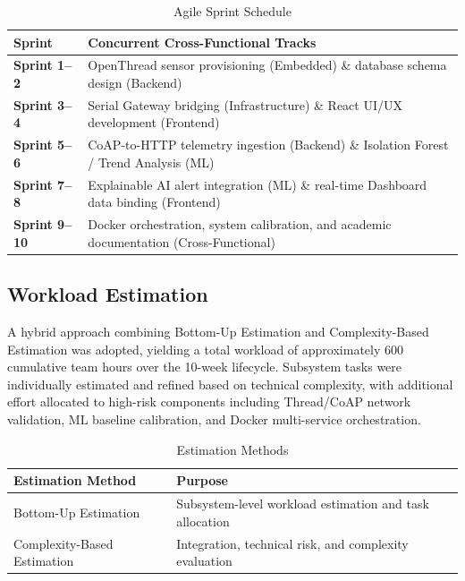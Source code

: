 \documentclass[10pt,a4paper]{article}
\begin{document}
\begin{table}[htbp]
\centering
\setlength{\tabcolsep}{4pt}
\renewcommand{\arraystretch}{1.0}
\caption{Agile Sprint Schedule}
\label{tab:sprint}
\small
\begin{tabularx}{\textwidth}{@{} >{\bfseries}p{2cm} >{\raggedright\arraybackslash}X @{}}
\toprule
Sprint & Concurrent Cross-Functional Tracks \\
\midrule
Sprint 1--2
  & OpenThread sensor provisioning (Embedded) \& database schema design (Backend) \\
\midrule
Sprint 3--4
  & Serial Gateway bridging (Infrastructure) \& React UI/UX development (Frontend) \\
\midrule
Sprint 5--6
  & CoAP-to-HTTP telemetry ingestion (Backend) \& Isolation Forest / Trend Analysis (ML) \\
\midrule
Sprint 7--8
  & Explainable AI alert integration (ML) \& real-time Dashboard data binding (Frontend) \\
\midrule
Sprint 9--10
  & Docker orchestration, system calibration, and academic documentation (Cross-Functional) \\
\bottomrule
\end{tabularx}
\end{table}

\subsection{Workload Estimation}

A hybrid approach combining Bottom-Up Estimation and Complexity-Based Estimation was adopted, yielding a total workload of approximately 600 cumulative team hours over the 10-week lifecycle. Subsystem tasks were individually estimated and refined based on technical complexity, with additional effort allocated to high-risk components including Thread/CoAP network validation, ML baseline calibration, and Docker multi-service orchestration.

\begin{table}[htbp]
\centering
\setlength{\tabcolsep}{4pt}
\renewcommand{\arraystretch}{1.0}
\caption{Estimation Methods}
\label{tab:estimation}
\small
\begin{tabularx}{\textwidth}{@{} >{\raggedright\arraybackslash}p{4cm} >{\raggedright\arraybackslash}X @{}}
\toprule
\textbf{Estimation Method} & \textbf{Purpose} \\
\midrule
Bottom-Up Estimation
  & Subsystem-level workload estimation and task allocation \\
\midrule
Complexity-Based Estimation
  & Integration, technical risk, and complexity evaluation \\
\bottomrule
\end{tabularx}
\end{table}
\end{document}
